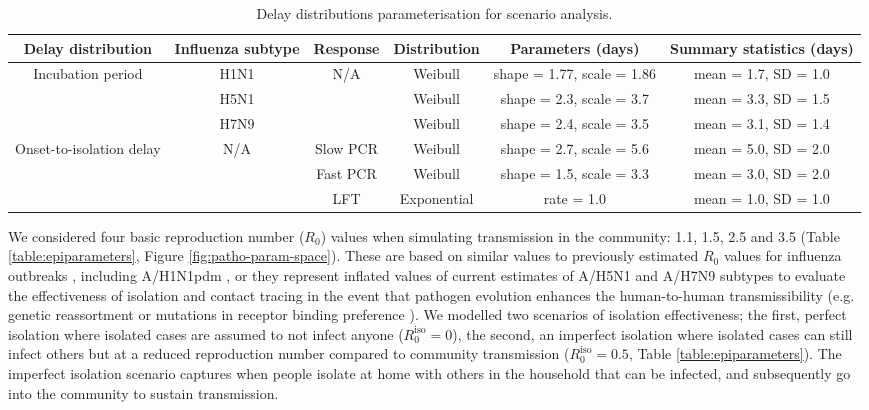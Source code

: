 \documentclass{article}
\begin{document}
\begin{table}[h!]
\centering
\caption{Delay distributions parameterisation for scenario analysis.}
\begin{tabular}{|c|c|c|c|c|c|}
 \hline
 Delay distribution & Influenza subtype & Response & Distribution & Parameters (days) & Summary statistics (days) \\
 \hline\hline
 \multirow{3}{4em}{Incubation period}
   & H1N1 & \multirow{3}{*}{N/A} & Weibull & shape = 1.77, scale = 1.86 & mean = 1.7, SD = 1.0 \\
 \cline{2-2}\cline{4-6}
   & H5N1 &  & Weibull & shape = 2.3, scale = 3.7 & mean = 3.3, SD = 1.5 \\
 \cline{2-2}\cline{4-6}
   & H7N9 &  & Weibull & shape = 2.4, scale = 3.5 & mean = 3.1, SD = 1.4 \\
 \hline
 \multirow{3}{4em}{Onset-to-isolation delay}
   & \multirow{3}{*}{N/A} & Slow PCR & Weibull & shape = 2.7, scale = 5.6 & mean = 5.0, SD = 2.0 \\
 \cline{3-6}
   &  & Fast PCR & Weibull & shape = 1.5, scale = 3.3 & mean = 3.0, SD = 2.0 \\
 \cline{3-6}
   &  & LFT & Exponential & rate = 1.0 & mean = 1.0, SD = 1.0 \\
 \hline
\end{tabular}
\label{table:delay-distributions}
\end{table}

We considered four basic reproduction number ($R_0$) values when simulating transmission in the community: 1.1, 1.5, 2.5 and 3.5 (Table \ref{table:epiparameters}, Figure \ref{fig:patho-param-space}). These are based on similar values to previously estimated $R_0$ values for influenza outbreaks \citep{fergusonStrategiesMitigatingInfluenza2006}, including A/H1N1pdm \citep{fraserPandemicPotentialStrain2009, lesslerOutbreak2009Pandemic2009}, or they represent inflated values of current estimates of A/H5N1 and A/H7N9 subtypes to evaluate the effectiveness of isolation and contact tracing in the event that pathogen evolution enhances the human-to-human transmissibility (e.g. genetic reassortment \citep{peacockGlobalH5N1Influenza2025} or mutations in receptor binding preference \citep{linSingleMutationBovine2024}). We modelled two scenarios of isolation effectiveness; the first, perfect isolation where isolated cases are assumed to not infect anyone ($R_0^\mathrm{iso} = 0$), the second, an imperfect isolation where isolated cases can still infect others but at a reduced reproduction number compared to community transmission ($R_0^\mathrm{iso} = 0.5$, Table \ref{table:epiparameters}). The imperfect isolation scenario captures when people isolate at home with others in the household that can be infected, and subsequently go into the community to sustain transmission. \\
\end{document}

